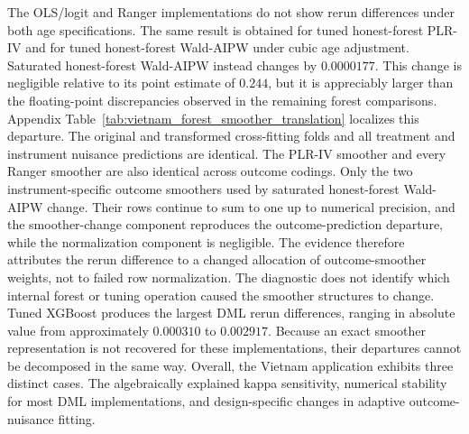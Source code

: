\documentclass[12pt, a4paper, oneside]{article}
\theoremstyle{plain}
\theoremstyle{definition}
\begin{document}
The OLS/logit and Ranger implementations do not show rerun differences under both age specifications. The same result is obtained for tuned
honest-forest PLR-IV and for tuned honest-forest Wald-AIPW under cubic age
adjustment.
 Saturated honest-forest Wald-AIPW instead changes by
\(0.0000177\). This change is negligible relative to its point estimate of
\(0.244\), but it is appreciably larger than the floating-point discrepancies
observed in the remaining forest comparisons.
Appendix Table~\ref{tab:vietnam_forest_smoother_translation} localizes this
departure. The original and transformed cross-fitting folds and all treatment and instrument nuisance predictions are identical. The PLR-IV smoother and every Ranger smoother are also identical across outcome codings. 
Only the two instrument-specific outcome smoothers used by saturated honest-forest Wald-AIPW change. Their rows continue to sum to one up to numerical precision, and the smoother-change component reproduces the outcome-prediction departure, while the normalization component is negligible.
The evidence therefore attributes the rerun difference to a changed allocation of outcome-smoother weights, not to failed row normalization. 
The diagnostic does not identify which internal forest or tuning operation caused the smoother structures to change.
Tuned XGBoost produces the largest DML rerun differences, ranging in absolute
value from approximately \(0.000310\) to \(0.002917\).
 Because an exact
smoother representation is not recovered for these implementations, their
departures cannot be decomposed in the same way.
 Overall, the Vietnam application exhibits three distinct cases.
The algebraically explained kappa sensitivity, numerical stability for most DML implementations, and design-specific changes in adaptive outcome-nuisance fitting.
\end{document}

